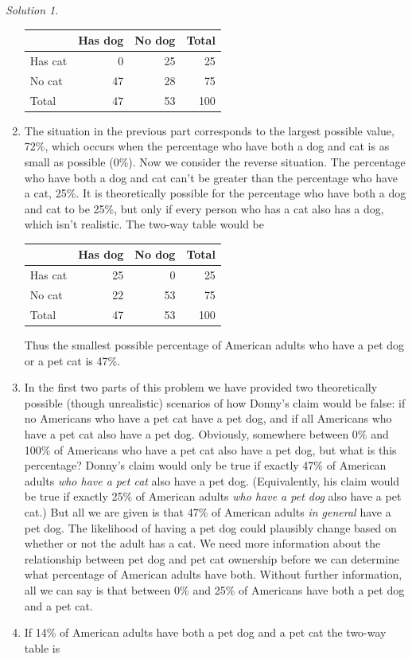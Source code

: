 \documentclass[
  letterpaper,
  DIV=11,
  numbers=noendperiod]{scrreprt}
\theoremstyle{plain}
\theoremstyle{definition}
\theoremstyle{definition}
\theoremstyle{definition}
\theoremstyle{remark}
\newtheorem{refsolution}{Solution}[chapter]
\begin{document}
\begin{tcolorbox}
\begin{refsolution}
\begin{enumerate}
  \begin{longtable}[]{@{}lrrr@{}}
  \toprule\noalign{}
  & Has dog & No dog & Total \\
  \midrule\noalign{}
  \endhead
  \bottomrule\noalign{}
  \endlastfoot
  Has cat & 0 & 25 & 25 \\
  No cat & 47 & 28 & 75 \\
  Total & 47 & 53 & 100 \\
  \end{longtable}
\item
  The situation in the previous part corresponds to the largest possible
  value, 72\%, which occurs when the percentage who have both a dog and
  cat is as small as possible (0\%). Now we consider the reverse
  situation. The percentage who have both a dog and cat can't be greater
  than the percentage who have a cat, 25\%. It is theoretically possible
  for the percentage who have both a dog and cat to be 25\%, but only if
  every person who has a cat also has a dog, which isn't realistic. The
  two-way table would be

  \begin{longtable}[]{@{}lrrr@{}}
  \toprule\noalign{}
  & Has dog & No dog & Total \\
  \midrule\noalign{}
  \endhead
  \bottomrule\noalign{}
  \endlastfoot
  Has cat & 25 & 0 & 25 \\
  No cat & 22 & 53 & 75 \\
  Total & 47 & 53 & 100 \\
  \end{longtable}

  Thus the smallest possible percentage of American adults who have a
  pet dog or a pet cat is 47\%.
\item
  In the first two parts of this problem we have provided two
  theoretically possible (though unrealistic) scenarios of how Donny's
  claim would be false: if no Americans who have a pet cat have a pet
  dog, and if all Americans who have a pet cat also have a pet dog.
  Obviously, somewhere between 0\% and 100\% of Americans who have a pet
  cat also have a pet dog, but what is this percentage? Donny's claim
  would only be true if exactly 47\% of American adults \emph{who have a
  pet cat} also have a pet dog. (Equivalently, his claim would be true
  if exactly 25\% of American adults \emph{who have a pet dog} also have
  a pet cat.) But all we are given is that 47\% of American adults
  \emph{in general} have a pet dog. The likelihood of having a pet dog
  could plausibly change based on whether or not the adult has a cat. We
  need more information about the relationship between pet dog and pet
  cat ownership before we can determine what percentage of American
  adults have both. Without further information, all we can say is that
  between 0\% and 25\% of Americans have both a pet dog and a pet cat.
\item
  If 14\% of American adults have both a pet dog and a pet cat the
  two-way table is


\end{enumerate}
\end{refsolution}
\end{tcolorbox}
\end{document}
